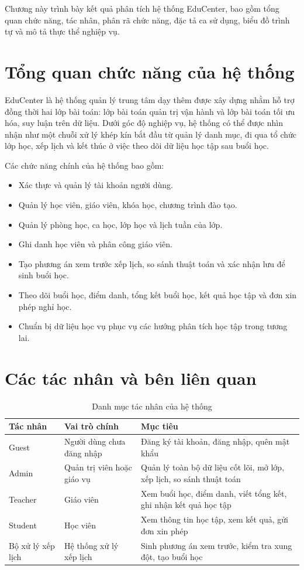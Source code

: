 \documentclass[../DoAn.tex]{subfiles}
\begin{document}
Chương này trình bày kết quả phân tích hệ thống EduCenter, bao gồm tổng quan chức năng, tác nhân, phân rã chức năng, đặc tả ca sử dụng, biểu đồ trình tự và mô tả thực thể nghiệp vụ.

\section{Tổng quan chức năng của hệ thống}
\label{section:2.1}

EduCenter là hệ thống quản lý trung tâm dạy thêm được xây dựng nhằm hỗ trợ đồng thời hai lớp bài toán: lớp bài toán quản trị vận hành và lớp bài toán tối ưu hóa, suy luận trên dữ liệu. Dưới góc độ nghiệp vụ, hệ thống có thể được nhìn nhận như một chuỗi xử lý khép kín bắt đầu từ quản lý danh mục, đi qua tổ chức lớp học, xếp lịch và kết thúc ở việc theo dõi dữ liệu học tập sau buổi học.

Các chức năng chính của hệ thống bao gồm:
\begin{itemize}
    \item Xác thực và quản lý tài khoản người dùng.
    \item Quản lý học viên, giáo viên, khóa học, chương trình đào tạo.
    \item Quản lý phòng học, ca học, lớp học và lịch tuần của lớp.
    \item Ghi danh học viên và phân công giáo viên.
    \item Tạo phương án xem trước xếp lịch, so sánh thuật toán và xác nhận lưu để sinh buổi học.
    \item Theo dõi buổi học, điểm danh, tổng kết buổi học, kết quả học tập và đơn xin phép nghỉ học.
    \item Chuẩn bị dữ liệu học vụ phục vụ các hướng phân tích học tập trong tương lai.
\end{itemize}

\section{Các tác nhân và bên liên quan}
\label{section:2.2}

\begin{table}[H]
\centering
\caption{Danh mục tác nhân của hệ thống}
\label{table:bang2.1}
\begin{tabular}{|l|l|p{7cm}|}
\hline
\textbf{Tác nhân} & \textbf{Vai trò chính} & \textbf{Mục tiêu} \\ \hline
Guest & Người dùng chưa đăng nhập & Đăng ký tài khoản, đăng nhập, quên mật khẩu \\ \hline
Admin & Quản trị viên hoặc giáo vụ & Quản lý toàn bộ dữ liệu cốt lõi, mở lớp, xếp lịch, so sánh thuật toán \\ \hline
Teacher & Giáo viên & Xem buổi học, điểm danh, viết tổng kết, ghi nhận kết quả học tập \\ \hline
Student & Học viên & Xem thông tin học tập, xem kết quả, gửi đơn xin phép \\ \hline
Bộ xử lý xếp lịch & Hệ thống xử lý xếp lịch & Sinh phương án xem trước, kiểm tra xung đột, tạo buổi học \\ \hline
\end{tabular}
\end{table}
\end{document}
